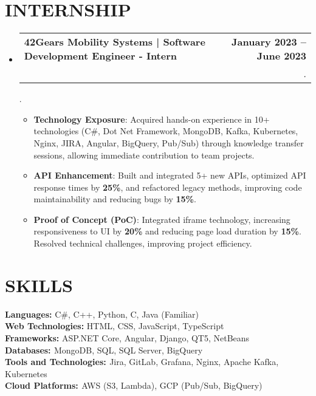 \documentclass[letterpaper,11pt]{article}
\makeatletter
\newcommand{\resumeItem}[1]{
  \item\small{
    {#1 \vspace{-2pt}}
  }
}
\newcommand{\resumeSubheading}[4]{
  \vspace{-2pt}\item
    \begin{tabular*}{1.0\textwidth}[t]{l@{\extracolsep{\fill}}r}
      \textbf{\large#1} & \textbf{\small #2} \\
      \textit{\large#3} & \textit{\small #4} \\
      
    \end{tabular*}\vspace{-7pt}
}
\newcommand{\resumeSubHeadingListStart}{\begin{itemize}[leftmargin=0.0in, label={}]}
\newcommand{\resumeSubHeadingListEnd}{\end{itemize}}
\newcommand{\resumeItemListStart}{\begin{itemize}}
\newcommand{\resumeItemListEnd}{\end{itemize}\vspace{-5pt}}
\makeatother
\begin{document}
\section{INTERNSHIP}
    \resumeSubHeadingListStart
        \resumeSubheading{ \href{https://www.linkedin.com/feed/update/urn:li:activity:6892339573460926464/} \large{{42Gears Mobility Systems  | Software Development Engineer - Intern}}}{January 2023 -- June 2023 }{\vspace{-15pt}}{.}
        {\vspace{-15pt}}{.}
        \vspace{2pt}
            \resumeItemListStart
 \resumeItem{\normalsize{{\textbf{\large{Technology Exposure}}}: Acquired hands-on experience in 10+ technologies (C\#, Dot Net Framework, MongoDB, Kafka, Kubernetes, Nginx, JIRA, Angular, BigQuery, Pub/Sub) through knowledge transfer sessions, allowing immediate contribution to team projects. }}

 \resumeItem{\normalsize{{\textbf{\large{API Enhancement}}}: Built and integrated 5+ new APIs, optimized API response times by \textbf{25\%}, and refactored legacy methods, improving code maintainability and reducing bugs by \textbf{15\%}.}}

 \resumeItem{\normalsize{{\textbf{\large{Proof of Concept (PoC)}}}: Integrated iframe technology, increasing responsiveness to UI by \textbf{ 20\%} and reducing page load duration by \textbf{15\%}. Resolved technical challenges, improving project efficiency.}}
            \resumeItemListEnd
    \resumeSubHeadingListEnd

\section{SKILLS}
 \begin{itemize}[leftmargin=0.15in, label={}]
    \small{\item{
     \textbf{\normalsize{Languages:}}{ 
     \normalsize{C\#, C++, Python, C, Java (Familiar)}} \\
     \textbf{\normalsize{Web Technologies:}}{ 
     \normalsize{HTML, CSS, JavaScript, TypeScript}} \\
     \textbf{\normalsize{Frameworks:}}{ \normalsize{ASP.NET Core, Angular, Django, QT5, NetBeans}} \\
     \textbf{\normalsize{Databases: }}{ \normalsize{MongoDB, SQL, SQL Server, BigQuery}} \\
     \textbf{\normalsize{Tools and Technologies: }}{\normalsize{Jira, GitLab, Grafana, Nginx, Apache Kafka, Kubernetes}} \\
     \textbf{\normalsize{Cloud Platforms: }}{\normalsize{AWS (S3, Lambda), GCP (Pub/Sub, BigQuery)}} \\
    }}
    
 \end{itemize}
\end{document}
